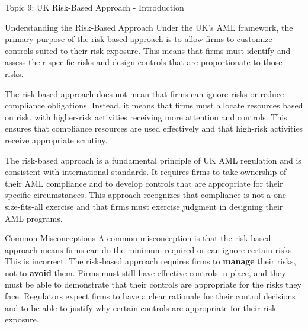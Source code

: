 \documentclass[8pt]{beamer}  %
\begin{document}
	\begin{frame}{Topic 9: UK Risk-Based Approach - Introduction}
		\begin{block}{\large Understanding the Risk-Based Approach}
			Under the UK's AML framework, the primary purpose of the risk-based approach is to allow firms to customize controls suited to their risk exposure. This means that firms must identify and assess their specific risks and design controls that are proportionate to those risks.
			
			The risk-based approach does not mean that firms can ignore risks or reduce compliance obligations. Instead, it means that firms must allocate resources based on risk, with higher-risk activities receiving more attention and controls. This ensures that compliance resources are used effectively and that high-risk activities receive appropriate scrutiny.
			
			The risk-based approach is a fundamental principle of UK AML regulation and is consistent with international standards. It requires firms to take ownership of their AML compliance and to develop controls that are appropriate for their specific circumstances. This approach recognizes that compliance is not a one-size-fits-all exercise and that firms must exercise judgment in designing their AML programs.
		\end{block}
		
		\vspace{0.2cm}
		\begin{block}{\large Common Misconceptions}
			A common misconception is that the risk-based approach means firms can do the minimum required or can ignore certain risks. This is incorrect. The risk-based approach requires firms to \textbf{manage} their risks, not to \textbf{avoid} them. Firms must still have effective controls in place, and they must be able to demonstrate that their controls are appropriate for the risks they face. Regulators expect firms to have a clear rationale for their control decisions and to be able to justify why certain controls are appropriate for their risk exposure.
		\end{block}
	\end{frame}
	
\end{document}
